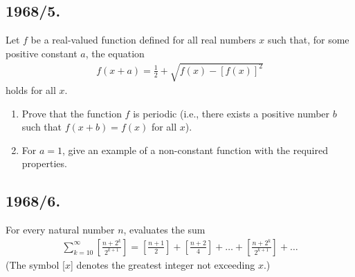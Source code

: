 \documentclass{article}
\begin{document}
\subsection*{1968/5.}
Let $f$ be a real-valued function defined for all real numbers $x$ such that, for some positive constant $a$, the equation
		\begin{align}
			f(x + a) = \frac{1}{2}+\sqrt{f(x)-[f(x)]^{2}}
		\end{align}
		\noindent holds for all $x$.
		\begin{enumerate}
			\item Prove that the function $f$ is periodic (i.e., there exists a positive number $b$ such that $f(x + b) = f(x)$ for all $x$).
			\item For $a = 1$, give an example of a non-constant function with the required properties.
		\end{enumerate}

\subsection*{1968/6.}
For every natural number $n$, evaluates the sum
		\begin{align}
			\sum\limits_{k=10}^{\infty}[\frac{n + 2^{k}}{2^{k+1}}] = [\frac{n + 1}{2}] + [\frac{n + 2}{4}] +\hdots+ [\frac{n + 2^{k}}{2^{k+1}}] +\hdots
		\end{align}
		\noindent (The symbol [$x$] denotes the greatest integer not exceeding $x$.)
\end{document}
